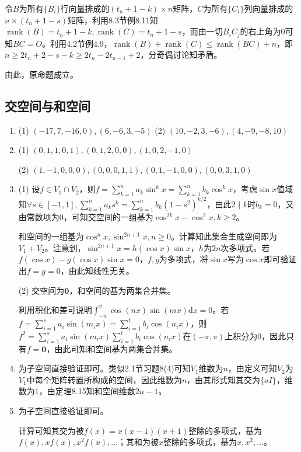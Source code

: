\documentclass[a4paper,UTF8,fontset=windows]{ctexart}
\DeclareMathOperator{\rank}{rank}
\begin{document}
\begin{enumerate}
令$B$为所有$\{B_i\}$行向量排成的$(t_n+1-k)\times n$矩阵，$C$为所有$\{C_i\}$列向量排成的$n\times(t_n+1-s)$矩阵，利用8.3节例8.11知$\rank(B)=t_n+1-k,\rank(C)=t_n+1-s$，而由一切$B_iC_j$的右上角为0可知$BC=O$。利用4.2节例4.9，$\rank(B)+\rank(C)\le\rank(BC)+n$，即$n\ge 2t_n+2-s-k\ge 2t_n-2t_{n-1}+2$，分奇偶讨论知矛盾。

由此，原命题成立。
\end{enumerate}

\subsection{交空间与和空间}
\begin{enumerate}
\item
(1) $(-17,7,-16,0),(6,-6,3,-5)$
(2) $(10,-2,3,-6),(4,-9,-8,10)$

\item
(1) $(0,1,1,0,1),(0,1,2,0,0),(1,0,2,-1,0)$

(2) $(1,-1,0,0,0),(0,0,0,1,1),(0,1,-1,0,0),(0,0,3,1,0)$

\item
(1) 设$f\in V_1\cap V_2$，则$f=\sum_{k=1}^na_k\sin^kx=\sum_{k=1}^nb_k\cos^kx$，考虑$\sin{x}$值域知$\forall s\in[-1,1],\sum_{k=1}^na_ks^k=\sum_{k=1}^nb_k(1-s^2)^{k/2}$，由此$2\nmid k$时$b_k=0$，又由常数项为0，可知交空间的一组基为$\cos^{2k}x-\cos^2x,k\ge2$。

和空间的一组基为$\cos^nx,\sin^{2n+1}x,n\ge0$。计算知此集合生成空间即为$V_1+V_2$。注意到，$\sin^{2n+1}x=h(\cos{x})\sin{x}$，$h$为$2n$次多项式。若$f(\cos{x})-g(\cos{x})\sin{x}=0$，$f,g$为多项式，将$\sin{x}$写为$\cos{x}$即可验证出$f=g=0$，由此知线性无关。

(2) 交空间为$\mathbf{0}$，和空间的基为两集合并集。

利用积化和差可说明$\int_{-\pi}^\pi\cos(nx)\sin(mx)\mathrm{d}x=0$。若$f=\sum_{i=1}^sa_i\sin(m_ix)=\sum_{i=1}^tb_i\cos(n_ix)$，则$f^2=\sum_{i=1}^sa_i\sin(m_ix)\sum_{i=1}^tb_i\cos(n_ix)$在$(-\pi,\pi)$上积分为0，因此只有$f=\mathbf{0}$，由此可知和空间基为两集合并集。

\item
为子空间直接验证即可。类似2.1节习题8(4)可知$V_1$维数为$n$，由定义可知$V_2$为$V_1$中每个矩阵转置所构成的空间，因此维数为$n$，由其形式知其交为$\{aI\}$，维数为1，由定理8.15知和空间维数$2n-1$。

\item
为子空间直接验证即可。

计算可知其交为被$f(x)=x(x-1)(x+1)$整除的多项式，基为$f(x),xf(x),x^2f(x),\dots$；其和为被$x$整除的多项式，基为$x,x^2,\dots$。


\end{enumerate}
\end{document}
